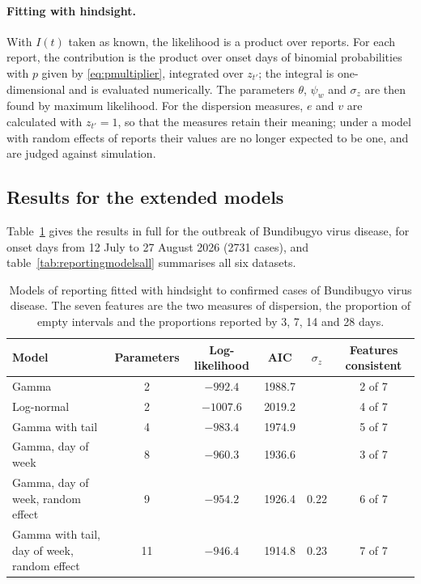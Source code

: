 \documentclass[11pt,a4paper]{article}
\begin{document}
\paragraph{Fitting with hindsight.} With $I(t)$ taken as known, the likelihood
is a product over reports. For each report, the contribution is the product
over onset days of binomial probabilities with $p$ given by
\eqref{eq:pmultiplier}, integrated over $z_{t'}$; the integral is
one-dimensional and is evaluated numerically. The parameters $\theta$,
$\psi_w$ and $\sigma_z$ are then found by maximum likelihood. For the
dispersion measures, $e$ and $v$ are calculated with $z_{t'}=1$, so that the
measures retain their meaning; under a model with random effects of reports
their values are no longer expected to be one, and are judged against
simulation.

\subsection{Results for the extended models}

Table~\ref{tab:reportingmodelsbvd} gives the results in full for the outbreak
of Bundibugyo virus disease, for onset days from 12 July to 27 August 2026
(2731 cases), and table~\ref{tab:reportingmodelsall} summarises all six
datasets.

\begin{table}[h]
\centering
\begin{tabular}{lccccc}
\toprule
Model & Parameters & Log-likelihood & AIC & $\sigma_z$ & Features consistent \\
\midrule
Gamma & 2 & $-992.4$ & 1988.7 & & 2 of 7 \\
Log-normal & 2 & $-1007.6$ & 2019.2 & & 4 of 7 \\
Gamma with tail & 4 & $-983.4$ & 1974.9 & & 5 of 7 \\
Gamma, day of week & 8 & $-960.3$ & 1936.6 & & 3 of 7 \\
Gamma, day of week, random effect & 9 & $-954.2$ & 1926.4 & 0.22 & 6 of 7 \\
Gamma with tail, day of week, random effect & 11 & $-946.4$ & 1914.8 & 0.23 & 7 of 7 \\
\bottomrule
\end{tabular}
\caption{Models of reporting fitted with hindsight to confirmed cases of
Bundibugyo virus disease. The seven features are the two measures of
dispersion, the proportion of empty intervals and the proportions reported by
3, 7, 14 and 28 days.}
\label{tab:reportingmodelsbvd}
\end{table}
\end{document}
